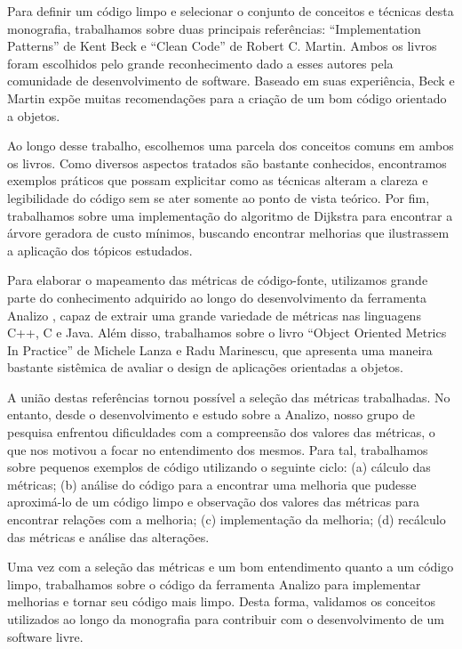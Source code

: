 Para definir um código limpo e selecionar o conjunto de conceitos e técnicas desta monografia, trabalhamos sobre duas principais referências: 
``Implementation Patterns'' \citep{Beck2007} de Kent Beck e ``Clean Code'' \citep{Martin2008} de Robert C. Martin. Ambos os livros foram escolhidos 
pelo grande reconhecimento dado a esses autores pela comunidade de desenvolvimento de software. Baseado em suas experiência, Beck e Martin 
expõe muitas recomendações para a criação de um bom código orientado a objetos.

Ao longo desse trabalho, escolhemos uma parcela dos conceitos comuns em ambos os livros. Como diversos aspectos tratados são bastante 
conhecidos, encontramos exemplos práticos que possam explicitar como as técnicas alteram a clareza e legibilidade do código sem se ater 
somente ao ponto de vista teórico. Por fim, trabalhamos sobre uma implementação do algoritmo de Dijkstra para encontrar a árvore geradora de 
custo mínimos, buscando encontrar melhorias que ilustrassem a aplicação dos tópicos estudados.

Para elaborar o mapeamento das métricas de código-fonte, utilizamos grande parte do conhecimento adquirido ao longo do desenvolvimento da 
ferramenta Analizo \cite{analizo2010} \cite{analizo_homepage}, capaz de extrair uma grande variedade de métricas nas linguagens C++, C e Java.
Além disso, trabalhamos sobre o livro ``Object Oriented Metrics In Practice'' \cite{Lanza06} de Michele Lanza e Radu Marinescu, que apresenta uma 
maneira bastante sistêmica de avaliar o design de aplicações orientadas a objetos. 

A união destas referências tornou possível a seleção das métricas trabalhadas. No entanto, desde o desenvolvimento e estudo sobre a Analizo, nosso grupo 
de pesquisa enfrentou dificuldades com a compreensão dos valores das métricas, o que nos motivou a focar no entendimento dos mesmos. Para tal, 
trabalhamos sobre pequenos exemplos de código utilizando o seguinte ciclo: (a) cálculo das métricas; (b) análise do código para a encontrar uma melhoria 
que pudesse aproximá-lo de um código limpo e observação dos valores das métricas para encontrar relações com a melhoria; (c) implementação da melhoria; 
(d) recálculo das métricas e análise das alterações.

Uma vez com a seleção das métricas e um bom entendimento quanto a um código limpo, trabalhamos sobre o código da ferramenta Analizo para implementar 
melhorias e tornar seu código mais limpo. Desta forma, validamos os conceitos utilizados ao longo da monografia para contribuir com o desenvolvimento de 
um software livre.

